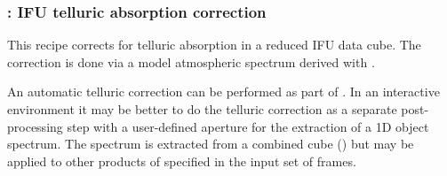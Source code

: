 \clearpage
\subsubsection{: IFU telluric absorption correction}
\label{sssec:ifu_tellcorr}
\label{rec:metis_ifu_tellcorr}

This recipe corrects for telluric absorption in a reduced IFU data
cube. The correction is done via a model atmospheric spectrum derived
with .

An automatic telluric correction can be performed as part of
. In an interactive environment it may be
better to do the telluric correction as a separate post-processing
step with a user-defined aperture for the extraction of a 1D object
spectrum. The spectrum is extracted from a combined cube
(\hyperref[dataitem:ifu_sci_combined]{}) but may be applied to other products of
 specified in the input set of frames.

